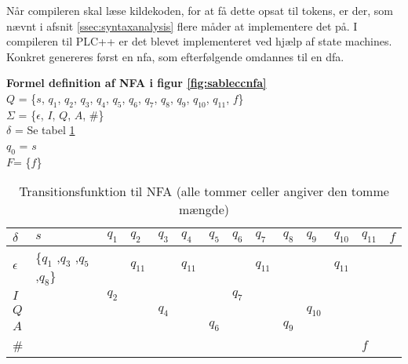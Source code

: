 \noindent Når compileren skal læse kildekoden, for at få dette opsat til tokens, er der, som nævnt i afsnit \ref{ssec:syntaxanalysis} flere måder at implementere det på. I compileren til PLC++ er det blevet implementeret ved hjælp af state machines. Konkret genereres først en \gls{nfa}, som efterfølgende omdannes til en \gls{dfa}.


\noindent \textbf{Formel definition af NFA i figur \ref{fig:sableccnfa}}\\
\noindent $Q$ = \{$s$, $q_1$, $q_2$, $q_3$, $q_4$, $q_5$, $q_6$, $q_7$, $q_8$, $q_9$, $q_{10}$, $q_{11}$, $f$\}\\
\noindent $\Sigma$ = \{$\epsilon$, $I$, $Q$, $A$, $\#$\}\\
\noindent $\delta$ = Se tabel \ref{tab:nfadelta}\\
\noindent $q_0$ = $s$\\
\noindent $F$= \{$f$\}\\


\begin{table}[H]
\centering
\footnotesize
{}
\begin{tabular}{l@{\hskip\tabcolsep\vrule width 1pt\hskip\tabcolsep}l|l|l|l|l|l|l|l|l|l|l|l|l}

$\delta$         & $s$              & $q_{1}$ & $q_{2}$ & $q_{3}$ & $q_{4}$ & $q_{5}$ & $q_{6}$ & $q_{7}$ & $q_{8}$ & $q_{9}$ & $q_{10}$ & $q_{11}$ & $f$ \\ \bottomrule
$\epsilon$ & \{$q_{1}$ ,$q_{3}$ ,$q_{5}$ ,$q_{8}$\} &   & $q_{11}$ &   & $q_{11}$ & & & $q_{11}$ & & & $q_{11}$ & &\\ 
$I$ & & $q_2$ & &       & &       & $q_7$ & &       &          & &     & \\ 
$Q$ & &       & & $q_4$ & &       &       & &       & $q_{10}$ & &     & \\ 
$A$ & &       & &       & & $q_6$ &       & & $q_9$ &          & &     & \\ 
\#  & &       & &       & &       &       & &       &          & & $f$ & \\
\end{tabular}
	\caption{Transitionsfunktion til NFA (alle tommer celler angiver den tomme mængde)}
    \label{tab:nfadelta}
\end{table}

